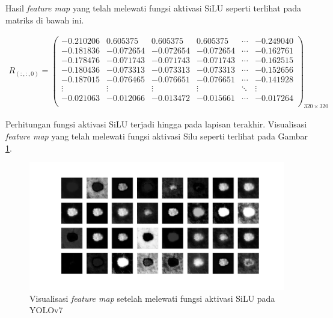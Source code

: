     Hasil \textit{feature map} yang telah melewati fungsi aktivasi SiLU seperti terlihat pada matriks di bawah ini.

    \begin{align*}
        R_{(:, :, 0)} = 
        \begin{pmatrix}
            -0.210206 & 0.605375  & 0.605375  & 0.605375  & \cdots & -0.249040 \\
            -0.181836 & -0.072654 & -0.072654 & -0.072654 & \cdots & -0.162761 \\
            -0.178476 & -0.071743 & -0.071743 & -0.071743 & \cdots & -0.162515 \\
            -0.180436 & -0.073313 & -0.073313 & -0.073313 & \cdots & -0.152656 \\
            -0.187015 & -0.076465 & -0.076651 & -0.076651 & \cdots & -0.141928 \\
            \vdots    & \vdots    & \vdots    & \vdots    & \ddots & \vdots \\
            -0.021063 & -0.012066 & -0.013472 & -0.015661 & \cdots & -0.017264 \\
        \end{pmatrix}_{320\times 320}
    \end{align*}

    Perhitungan fungsi aktivasi SiLU terjadi hingga pada lapisan terakhir. Visualisasi \textit{feature map} yang telah melewati fungsi aktivasi Silu seperti terlihat pada Gambar \ref{fig:d-silu}.

    \begin{figure}[H]
        \begin{center}
            \includegraphics[width=12cm]{img/bab4/silu-layer.png}
            \caption{Visualisasi \textit{feature map} setelah melewati fungsi aktivasi SiLU pada YOLOv7}
            \label{fig:d-silu}
        \end{center}
    \end{figure}

